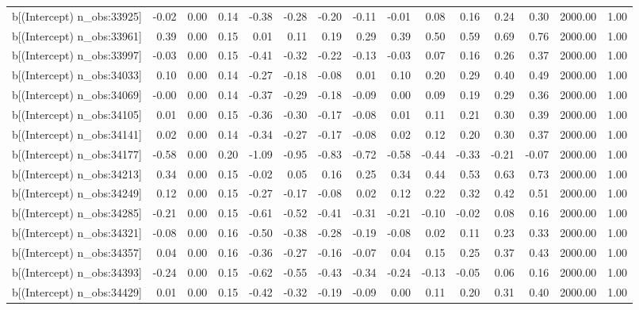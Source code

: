 \begin{table}[ht]
\begin{tabular}{rrrrrrrrrrrrrrr}
  b[(Intercept) n\_obs:33925] & -0.02 & 0.00 & 0.14 & -0.38 & -0.28 & -0.20 & -0.11 & -0.01 & 0.08 & 0.16 & 0.24 & 0.30 & 2000.00 & 1.00 \\ 
  b[(Intercept) n\_obs:33961] & 0.39 & 0.00 & 0.15 & 0.01 & 0.11 & 0.19 & 0.29 & 0.39 & 0.50 & 0.59 & 0.69 & 0.76 & 2000.00 & 1.00 \\ 
  b[(Intercept) n\_obs:33997] & -0.03 & 0.00 & 0.15 & -0.41 & -0.32 & -0.22 & -0.13 & -0.03 & 0.07 & 0.16 & 0.26 & 0.37 & 2000.00 & 1.00 \\ 
  b[(Intercept) n\_obs:34033] & 0.10 & 0.00 & 0.14 & -0.27 & -0.18 & -0.08 & 0.01 & 0.10 & 0.20 & 0.29 & 0.40 & 0.49 & 2000.00 & 1.00 \\ 
  b[(Intercept) n\_obs:34069] & -0.00 & 0.00 & 0.14 & -0.37 & -0.29 & -0.18 & -0.09 & 0.00 & 0.09 & 0.19 & 0.29 & 0.36 & 2000.00 & 1.00 \\ 
  b[(Intercept) n\_obs:34105] & 0.01 & 0.00 & 0.15 & -0.36 & -0.30 & -0.17 & -0.08 & 0.01 & 0.11 & 0.21 & 0.30 & 0.39 & 2000.00 & 1.00 \\ 
  b[(Intercept) n\_obs:34141] & 0.02 & 0.00 & 0.14 & -0.34 & -0.27 & -0.17 & -0.08 & 0.02 & 0.12 & 0.20 & 0.30 & 0.37 & 2000.00 & 1.00 \\ 
  b[(Intercept) n\_obs:34177] & -0.58 & 0.00 & 0.20 & -1.09 & -0.95 & -0.83 & -0.72 & -0.58 & -0.44 & -0.33 & -0.21 & -0.07 & 2000.00 & 1.00 \\ 
  b[(Intercept) n\_obs:34213] & 0.34 & 0.00 & 0.15 & -0.02 & 0.05 & 0.16 & 0.25 & 0.34 & 0.44 & 0.53 & 0.63 & 0.73 & 2000.00 & 1.00 \\ 
  b[(Intercept) n\_obs:34249] & 0.12 & 0.00 & 0.15 & -0.27 & -0.17 & -0.08 & 0.02 & 0.12 & 0.22 & 0.32 & 0.42 & 0.51 & 2000.00 & 1.00 \\ 
  b[(Intercept) n\_obs:34285] & -0.21 & 0.00 & 0.15 & -0.61 & -0.52 & -0.41 & -0.31 & -0.21 & -0.10 & -0.02 & 0.08 & 0.16 & 2000.00 & 1.00 \\ 
  b[(Intercept) n\_obs:34321] & -0.08 & 0.00 & 0.16 & -0.50 & -0.38 & -0.28 & -0.19 & -0.08 & 0.02 & 0.11 & 0.23 & 0.33 & 2000.00 & 1.00 \\ 
  b[(Intercept) n\_obs:34357] & 0.04 & 0.00 & 0.16 & -0.36 & -0.27 & -0.16 & -0.07 & 0.04 & 0.15 & 0.25 & 0.37 & 0.43 & 2000.00 & 1.00 \\ 
  b[(Intercept) n\_obs:34393] & -0.24 & 0.00 & 0.15 & -0.62 & -0.55 & -0.43 & -0.34 & -0.24 & -0.13 & -0.05 & 0.06 & 0.16 & 2000.00 & 1.00 \\ 
  b[(Intercept) n\_obs:34429] & 0.01 & 0.00 & 0.15 & -0.42 & -0.32 & -0.19 & -0.09 & 0.00 & 0.11 & 0.20 & 0.31 & 0.40 & 2000.00 & 1.00 \\ 

\end{tabular}
\end{table}
